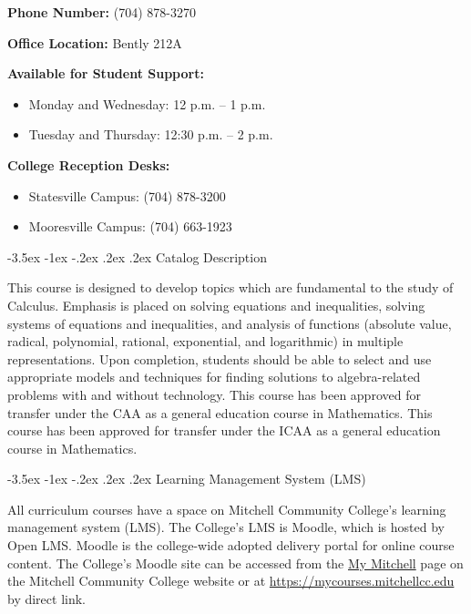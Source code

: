 \documentclass{article}
\makeatletter
\renewcommand\section{\@startsection{section}{1}{0pt}%
  {-3.5ex \@plus -1ex \@minus -.2ex}%
  {.2ex \@plus.2ex}%
  {\normalfont\Large\bfseries}} %
\makeatother
\begin{document}
\textbf{Phone Number:} (704) 878-3270

\textbf{Office Location:} Bently 212A

\textbf{Available for Student Support:}

\begin{itemize}
\item Monday and Wednesday: 12 p.m. -- 1 p.m.
\item Tuesday and Thursday: 12:30 p.m. -- 2 p.m.
\end{itemize}

\textbf{College Reception Desks:}

\begin{itemize}
\item Statesville Campus: (704) 878-3200
\item Mooresville Campus: (704) 663-1923
\end{itemize}

\section{Catalog Description}

This course is designed to develop topics which are fundamental to the study of Calculus. Emphasis is placed on solving equations and inequalities, solving systems of equations and inequalities, and analysis of functions (absolute value, radical, polynomial, rational, exponential, and logarithmic) in multiple representations. Upon completion, students should be able to select and use appropriate models and techniques for finding solutions to algebra-related problems with and without technology. This course has been approved for transfer under the CAA as a general education course in Mathematics. This course has been approved for transfer under the ICAA as a general education course in Mathematics.

\section{Learning Management System (LMS)}

All curriculum courses have a space on Mitchell Community College's learning management system (LMS). The College's LMS is Moodle, which is hosted by Open LMS. Moodle is the college-wide adopted delivery portal for online course content. The College's Moodle site can be accessed from the \href{https://mitchellcc.edu/my-mitchell}{My Mitchell} page on the Mitchell Community College website or at \href{https://mycourses.mitchellcc.edu}{https://mycourses.mitchellcc.edu} by direct link.
\end{document}
